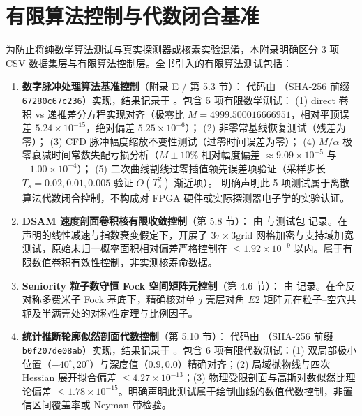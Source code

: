 \section{有限算法控制与代数闭合基准}\label{sec:appF-finite-controls}

为防止将纯数学算法测试与真实探测器或核素实验混淆，本附录明确区分 3 项 CSV 数据集层与有限算法控制层。全书引入的有限算法测试包括：
\begin{enumerate}[label=(\arabic*),leftmargin=2em]
    \item \textbf{数字脉冲处理算法基准控制}（附录 E / 第 5.3 节）：
    代码由 （SHA-256 前缀 \texttt{67280c67c236}）实现，结果记录于 。包含 5 项有限数学测试：
    (1) direct 卷积 vs 递推差分方程实现对齐（极零比 $M=4999.500016666951$，相对平顶误差 $5.24 \times 10^{-15}$，绝对偏差 $5.25 \times 10^{-6}$）；
    (2) 非零常基线恢复测试（残差为零）；
    (3) CFD 脉冲幅度缩放不变性测试（过零时间误差为零）；
    (4) $M/\alpha$ 极零衰减时间常数失配亏损分析（$M \pm 10\%$ 相对幅度偏差 $\approx 9.09 \times 10^{-5}$ 与 $-1.00 \times 10^{-4}$）；
    (5) 二次曲线割线过零插值领先误差项验证（采样步长 $T_s = 0.02, 0.01, 0.005$ 验证 $O(T_s^2)$ 渐近项）。
    明确声明此 5 项测试属于离散算法代数闭合控制，不构成对 FPGA 硬件或实际探测器电子学的实验认证。
    \vspace{1ex}
    \item \textbf{DSAM 速度剖面卷积核有限收敛控制}（第 5.8 节）：
    由  与测试包  记录。在声明的线性减速与指数衰变假定下，开展了 $3\tau \times 3\text{grid}$ 网格加密与支持域加宽测试，原始未归一概率面积相对偏差严格控制在 $\le 1.92 \times 10^{-9}$ 以内。属于有限数值卷积有效性控制，非实测核寿命数据。
    \vspace{1ex}
    \item \textbf{Seniority 粒子数守恒 Fock 空间矩阵元控制}（第 4.6 节）：
    由  记录。在全反对称多费米子 Fock 基底下，精确核对单 $j$ 壳层对角 $E2$ 矩阵元在粒子--空穴共轭及半满壳处的对称性定理与比例因子。
    \vspace{1ex}
    \item \textbf{统计推断轮廓似然剖面代数控制}（第 5.10 节）：
    代码由 （SHA-256 前缀 \texttt{b0f207de08ab}）实现，结果记录于 。包含 6 项有限代数测试：(1) 双局部极小位置（$-40^\circ, 20^\circ$）与深度值（$0.9, 0.0$）精确对齐；(2) 局域抛物线与四次 Hessian 展开拟合偏差 $\le 4.27 \times 10^{-13}$；(3) 物理受限剖面与高斯对数似然比理论偏差 $\le 1.78 \times 10^{-15}$。明确声明此测试属于绘制曲线的数值代数控制，非置信区间覆盖率或 Neyman 带检验。
\end{enumerate}

